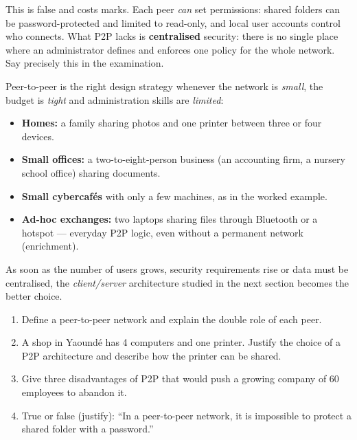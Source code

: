 \documentclass[11pt]{article}
\newcounter{popsec}
\newcounter{popsub}
\newcommand{\courssub}[1]{%
  \stepcounter{popsub}%
  \par\vspace{9pt}\noindent{\popxbold\fontsize{11.5}{13}\selectfont\color{popink}{\color{poporange}\thepopsec.\thepopsub}\hspace{6pt}#1}\par\nopagebreak\vspace{4pt}
}
\begin{document}
\begin{attention}
This is false and costs marks. Each peer \emph{can} set permissions: shared folders can be password-protected and limited to read-only, and local user accounts control who connects. What P2P lacks is \textbf{centralised} security: there is no single place where an administrator defines and enforces one policy for the whole network. Say precisely this in the examination.
\end{attention}

\courssub{Where is P2P suitable?}

Peer-to-peer is the right design strategy whenever the network is \emph{small}, the budget is \emph{tight} and administration skills are \emph{limited}:

\begin{itemize}
\item \textbf{Homes:} a family sharing photos and one printer between three or four devices.
\item \textbf{Small offices:} a two-to-eight-person business (an accounting firm, a nursery school office) sharing documents.
\item \textbf{Small cybercafés} with only a few machines, as in the worked example.
\item \textbf{Ad-hoc exchanges:} two laptops sharing files through Bluetooth or a hotspot --- everyday P2P logic, even without a permanent network (enrichment).
\end{itemize}

As soon as the number of users grows, security requirements rise or data must be centralised, the \emph{client/server} architecture studied in the next section becomes the better choice.

\begin{exercice}
\begin{enumerate}
\item Define a peer-to-peer network and explain the double role of each peer.
\item A shop in Yaoundé has 4 computers and one printer. Justify the choice of a P2P architecture and describe how the printer can be shared.
\item Give three disadvantages of P2P that would push a growing company of 60 employees to abandon it.
\item True or false (justify): ``In a peer-to-peer network, it is impossible to protect a shared folder with a password.''
\end{enumerate}
\end{exercice}
\end{document}
